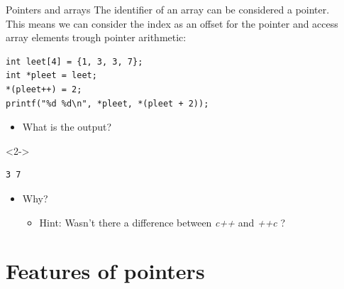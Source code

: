 
\begin{frame}[fragile]{Pointers and arrays}
	The identifier of an array can be considered a pointer.\\
	This means we can consider the index as an offset for the pointer and access array elements trough pointer arithmetic:
	\begin{lstlisting}[numbers=none]
int leet[4] = {1, 3, 3, 7};
int *pleet = leet;
*(pleet++) = 2;
printf("%d %d\n", *pleet, *(pleet + 2));
\end{lstlisting}
	\begin{itemize}
		\item What is the output?
	\end{itemize}
	\begin{uncoverenv}<2->
		\begin{lstlisting}[numbers=none]
3 7
\end{lstlisting}
		\begin{itemize}
			\item Why?
			\begin{itemize}
				\item<3-> Hint: Wasn't there a difference between \textit{c++} and \textit{++c} ?
			\end{itemize}
		\end{itemize}
	\end{uncoverenv}
\end{frame}

\section{Features of pointers}

